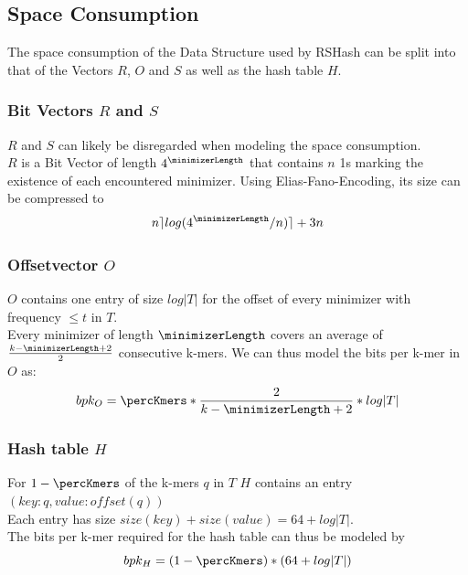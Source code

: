 \subsection*{Space Consumption}
The space consumption of the Data Structure used by RSHash can be split into that of the Vectors $R$, $O$ and $S$ as well as the hash table $H$.

\subsubsection*{Bit Vectors $R$ and $S$}
$R$ and $S$ can likely be disregarded when modeling the space consumption. \\
$R$ is a Bit Vector of length $4^\minimizerLength$ that contains $n$  1s marking the existence of each encountered minimizer. Using Elias-Fano-Encoding, its size can be compressed to
\[ n \rceil log(4^\minimizerLength/n) \rceil + 3n\]

\subsubsection*{Offsetvector $O$}
$O$ contains one entry of size $log |T|$ for the offset of every minimizer with frequency $\leq t$ in $T$.\\
Every minimizer of length $\minimizerLength$ covers an average of $\frac{k-\minimizerLength+2}{2}$ consecutive k-mers. We can thus model the bits per k-mer in $O$ as:\\
\[bpk_O = \percKmers * \frac{2}{k-\minimizerLength+2} * log |T| \]

\subsubsection*{Hash table $H$}
For $1-\percKmers$ of the k-mers $q$ in $T$ $H$ contains an entry $(key:q, value:offset(q))$\\
Each entry has size $size(key) + size(value) = 64 + log |T|$.\\
The bits per k-mer required for the hash table can thus be modeled by
\[ bpk_H = (1-\percKmers) * (64 + log|T|)\]

